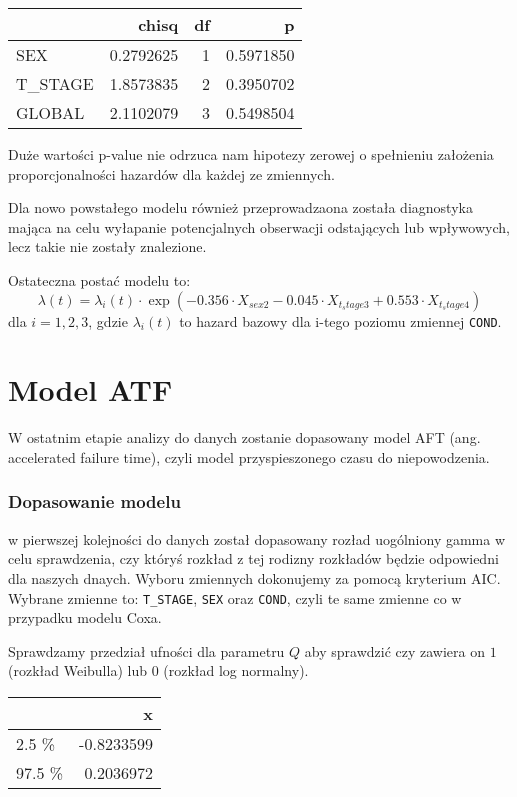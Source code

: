 \documentclass[
]{article}
\begin{document}
\begin{longtable}[]{@{}lrrr@{}}
\toprule
& chisq & df & p \\
\midrule
\endhead
SEX & 0.2792625 & 1 & 0.5971850 \\
T\_STAGE & 1.8573835 & 2 & 0.3950702 \\
GLOBAL & 2.1102079 & 3 & 0.5498504 \\
\bottomrule
\end{longtable}

Duże wartości p-value nie odrzuca nam hipotezy zerowej o spełnieniu
założenia proporcjonalności hazardów dla każdej ze zmiennych.

Dla nowo powstałego modelu również przeprowadzaona została diagnostyka
mająca na celu wyłapanie potencjalnych obserwacji odstających lub
wpływowych, lecz takie nie zostały znalezione.

Ostateczna postać modelu to: \[
\lambda(t) = \lambda_{i}(t)\cdot \exp(-0.356 \cdot X_{sex2} - 0.045 \cdot X_{t_stage3} + 0.553 \cdot X_{t_stage4})
\] dla \(i = 1, 2, 3\), gdzie \(\lambda_{i}(t)\) to hazard bazowy dla
i-tego poziomu zmiennej \texttt{COND}.

\hypertarget{model-atf}{%
\section{Model ATF}\label{model-atf}}

W ostatnim etapie analizy do danych zostanie dopasowany model AFT (ang.
accelerated failure time), czyli model przyspieszonego czasu do
niepowodzenia.

\hypertarget{dopasowanie-modelu}{%
\subsubsection{Dopasowanie modelu}\label{dopasowanie-modelu}}

w pierwszej kolejności do danych został dopasowany rozład uogólniony
gamma w celu sprawdzenia, czy któryś rozkład z tej rodizny rozkładów
będzie odpowiedni dla naszych dnaych. Wyboru zmiennych dokonujemy za
pomocą kryterium AIC. Wybrane zmienne to: \texttt{T\_STAGE},
\texttt{SEX} oraz \texttt{COND}, czyli te same zmienne co w przypadku
modelu Coxa.

Sprawdzamy przedział ufności dla parametru \(Q\) aby sprawdzić czy
zawiera on \(1\) (rozkład Weibulla) lub \(0\) (rozkład log normalny).

\begin{longtable}[]{@{}lr@{}}
\toprule
& x \\
\midrule
\endhead
2.5 \% & -0.8233599 \\
97.5 \% & 0.2036972 \\
\bottomrule
\end{longtable}
\end{document}
